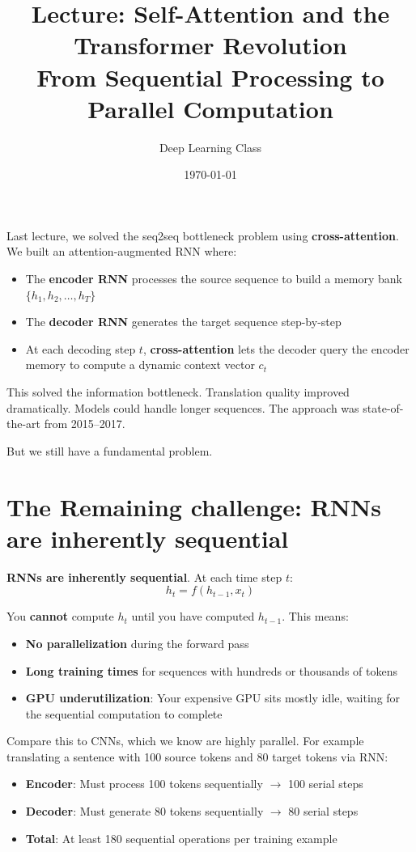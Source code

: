 \documentclass{article}
\title{Lecture: Self-Attention and the Transformer Revolution\\
From Sequential Processing to Parallel Computation}
\author{Deep Learning Class}
\date{\today}
\begin{document}
\maketitle


Last lecture, we solved the seq2seq bottleneck problem using \textbf{cross-attention}. We built an attention-augmented RNN where:

\begin{itemize}
\item The \textbf{encoder RNN} processes the source sequence to build a memory bank $\{h_1, h_2, \ldots, h_T\}$
\item The \textbf{decoder RNN} generates the target sequence step-by-step
\item At each decoding step $t$, \textbf{cross-attention} lets the decoder query the encoder memory to compute a dynamic context vector $c_t$
\end{itemize}

This solved the information bottleneck. Translation quality improved dramatically. Models could handle longer sequences. The approach was state-of-the-art from 2015--2017.

But we still have a fundamental problem.

\section{The Remaining challenge: RNNs are inherently sequential}
\textbf{RNNs are inherently sequential}. At each time step $t$:
\[
h_t = f(h_{t-1}, x_t)
\]

You \textbf{cannot} compute $h_t$ until you have computed $h_{t-1}$. This means:

\begin{itemize}
\item \textbf{No parallelization} during the forward pass
\item \textbf{Long training times} for sequences with hundreds or thousands of tokens
\item \textbf{GPU underutilization}: Your expensive GPU sits mostly idle, waiting for the sequential computation to complete
\end{itemize}

Compare this to CNNs, which we know are highly parallel. For example translating a sentence with 100 source tokens and 80 target tokens via RNN:

\begin{itemize}
\item \textbf{Encoder}: Must process 100 tokens sequentially $\rightarrow$ 100 serial steps
\item \textbf{Decoder}: Must generate 80 tokens sequentially $\rightarrow$ 80 serial steps
\item \textbf{Total}: At least 180 sequential operations per training example
\end{itemize}
\end{document}
